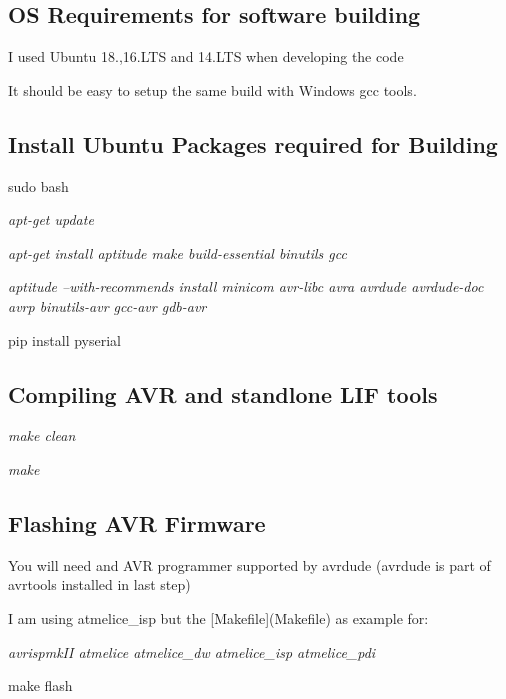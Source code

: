 \subsection*{OS Requirements for software building}


\begin{DoxyItemize}
\item I used Ubuntu 18.,16.\+L\+TS and 14.\+L\+TS when developing the code
\begin{DoxyItemize}
\item It should be easy to setup the same build with Windows gcc tools.
\end{DoxyItemize}
\end{DoxyItemize}

\subsection*{Install Ubuntu Packages required for Building}


\begin{DoxyItemize}
\item sudo bash
\item {\itshape apt-\/get update}
\item {\itshape apt-\/get install aptitude make build-\/essential binutils gcc}
\item {\itshape aptitude --with-\/recommends install minicom avr-\/libc avra avrdude avrdude-\/doc avrp binutils-\/avr gcc-\/avr gdb-\/avr}
\item pip install pyserial
\end{DoxyItemize}

\subsection*{Compiling A\+VR and standlone L\+IF tools}


\begin{DoxyItemize}
\item {\itshape make clean}
\item {\itshape make}
\end{DoxyItemize}

\subsection*{Flashing A\+VR Firmware}


\begin{DoxyItemize}
\item You will need and A\+VR programmer supported by avrdude (avrdude is part of avrtools installed in last step)
\begin{DoxyItemize}
\item I am using atmelice\+\_\+isp but the \mbox{[}Makefile\mbox{]}(Makefile) as example for\+:
\begin{DoxyItemize}
\item {\itshape avrispmk\+II atmelice atmelice\+\_\+dw atmelice\+\_\+isp atmelice\+\_\+pdi}
\end{DoxyItemize}
\end{DoxyItemize}
\item make flash
\end{DoxyItemize}

